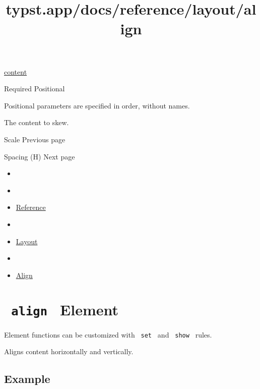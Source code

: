 \href{/docs/reference/foundations/content/}{content}

{Required} {{ Positional }}

\label{parameters-body-positional-tooltip}
Positional parameters are specified in order, without names.

The content to skew.

\href{/docs/reference/layout/scale/}{\pandocbounded{}}

{ Scale } { Previous page }

\href{/docs/reference/layout/h/}{\pandocbounded{}}

{ Spacing (H) } { Next page }


\title{typst.app/docs/reference/layout/align}

\begin{itemize}
\tightlist
\item
  \href{/docs}{}
\item
  
\item
  \href{/docs/reference/}{Reference}
\item
  
\item
  \href{/docs/reference/layout/}{Layout}
\item
  
\item
  \href{/docs/reference/layout/align/}{Align}
\end{itemize}

\section{\texorpdfstring{\texttt{\ align\ } {{ Element
}}}{ align   Element }}\label{summary}

\label{element-tooltip}
Element functions can be customized with \texttt{\ set\ } and
\texttt{\ show\ } rules.

Aligns content horizontally and vertically.

\subsection{Example}\label{example}

